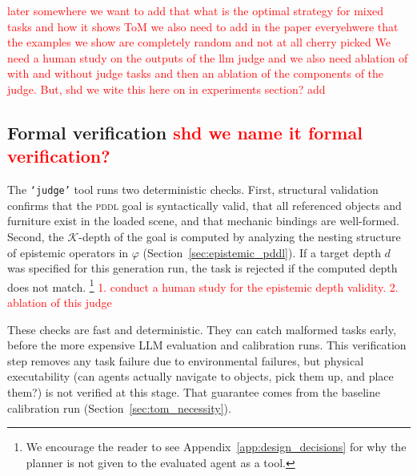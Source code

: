 \documentclass{article} %
\newcommand{\K}{\mathcal{K}}
\newcommand{\goal}{\varphi}
\newcommand{\pddl}{\textsc{pddl}}
\newcommand{\g}[1]{\textcolor{red}{#1}}
\begin{document}
\g{later somewhere we want to add that what is the optimal strategy for mixed tasks and how it shows ToM
we also need to add in the paper everyehwere that the examples we show are completely random and not at all cherry picked}
\g{We need a human study on the outputs of the llm judge and we also need ablation of with and without judge tasks and then an ablation of the components of the judge. But, shd we wite this here on in experiments section? add}

\subsection{Formal verification \g{shd we name it formal verification?}}
\label{sec:verification}

The \texttt{`judge'} tool runs two deterministic checks. First, structural validation confirms that the \pddl{} goal is syntactically valid, that all referenced objects and furniture exist in the loaded scene, and that mechanic bindings are well-formed. Second, the $\K$-depth of the goal is computed by analyzing the nesting structure of epistemic operators in $\goal$ (Section~\ref{sec:epistemic_pddl}). If a target depth $d$ was specified for this generation run, the task is rejected if the computed depth does not match.%
\footnote{We encourage the reader to see Appendix~\ref{app:design_decisions} for why the planner is not given to the evaluated agent as a tool.}
\g{1. conduct a human study for the epistemic depth validity. 2. ablation of this judge}

These checks are fast and deterministic. They can catch malformed tasks early, before the more expensive LLM evaluation and calibration runs. This verification step removes any task failure due to environmental failures, but physical executability (can agents actually navigate to objects, pick them up, and place them?) is not verified at this stage. That guarantee comes from the baseline calibration run (Section~\ref{sec:tom_necessity}).
\end{document}
